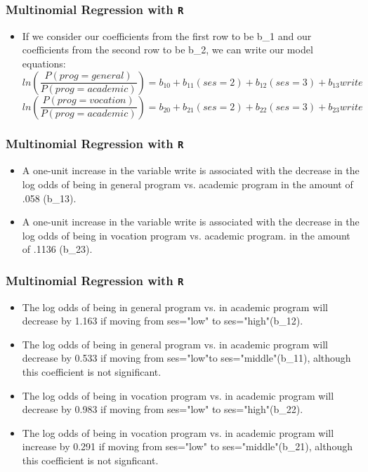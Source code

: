 \documentclass[00-GLMregslides.tex]{subfiles}
\begin{document}
\begin{frame}[fragile]
\frametitle{Multinomial Regression with \texttt{R}}
\Large
\begin{itemize}
\item If we consider our coefficients from the first row to be b\_1 and our coefficients from the second row to be b\_2, we can write our model equations: \[ ln\left(\frac{P(prog=general)}{P(prog=academic)}\right) = b_{10} + b_{11}(ses=2) + b_{12}(ses=3) + b_{13}write \] \[ ln\left(\frac{P(prog=vocation)}{P(prog=academic)}\right) = b_{20} + b_{21}(ses=2) + b_{22}(ses=3) + b_{23}write \] 
\end{itemize}
\end{frame}
\begin{frame}[fragile]
	
	\frametitle{Multinomial Regression with \texttt{R}}
	\Large
	\begin{itemize}

\item A one-unit increase in the variable write is associated with the decrease in the log odds of being in general program vs. academic program in the amount of .058 (b\_13).
\item A one-unit increase in the variable write is associated with the decrease in the log odds of being in vocation program vs. academic program. in the amount of .1136 (b\_23).
\end{itemize}
\end{frame}
\begin{frame}[fragile]

\frametitle{Multinomial Regression with \texttt{R}}
\Large
\begin{itemize}
\item The log odds of being in general program vs. in academic program will decrease by 1.163 if moving from ses="low" to ses="high"(b\_12).
\item The log odds of being in general program vs. in academic program will decrease by 0.533 if moving from ses="low"to ses="middle"(b\_11), although this coefficient is not significant.
\item The log odds of being in vocation program vs. in academic program will decrease by 0.983 if moving from ses="low" to ses="high"(b\_22).
\item The log odds of being in vocation program vs. in academic program will increase by 0.291 if moving from ses="low" to ses="middle"(b\_21), although this coefficient is not signficant.
\end{itemize}
\end{frame}
\end{document}
